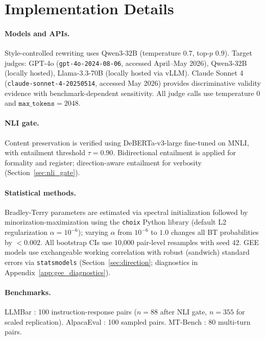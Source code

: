 \section{Implementation Details}
\label{app:implementation}

\paragraph{Models and APIs.}
Style-controlled rewriting uses Qwen3-32B (temperature $0.7$, top-$p$ $0.9$).
Target judges: GPT-4o (\texttt{gpt-4o-2024-08-06}, accessed April--May 2026), Qwen3-32B (locally hosted), Llama-3.3-70B (locally hosted via vLLM).
Claude Sonnet 4 (\texttt{claude-sonnet-4-20250514}, accessed May 2026) provides discriminative validity evidence with benchmark-dependent sensitivity.
All judge calls use temperature $0$ and $\texttt{max\_tokens} = 2048$.

\paragraph{NLI gate.}
Content preservation is verified using DeBERTa-v3-large \citep{he2021debertav3} fine-tuned on MNLI, with entailment threshold $\tau = 0.90$.
Bidirectional entailment is applied for formality and register; direction-aware entailment for verbosity (Section~\ref{sec:nli_gate}).

\paragraph{Statistical methods.}
Bradley-Terry parameters are estimated via spectral initialization followed by minorization-maximization \citep{hunter2004mm} using the \texttt{choix} Python library (default L2 regularization $\alpha = 10^{-6}$); varying $\alpha$ from $10^{-6}$ to $1.0$ changes all BT probabilities by ${<}0.002$.
All bootstrap CIs use 10{,}000 pair-level resamples with seed $42$.
GEE models use exchangeable working correlation with robust (sandwich) standard errors via \texttt{statsmodels} (Section~\ref{sec:direction}; diagnostics in Appendix~\ref{app:gee_diagnostics}).

\paragraph{Benchmarks.}
LLMBar \citep{zeng2023llmbar}: 100 instruction-response pairs ($n = 88$ after NLI gate, $n = 355$ for scaled replication).
AlpacaEval \citep{dubois2025lc}: 100 sampled pairs.
MT-Bench \citep{zheng2023judging}: 80 multi-turn pairs.


